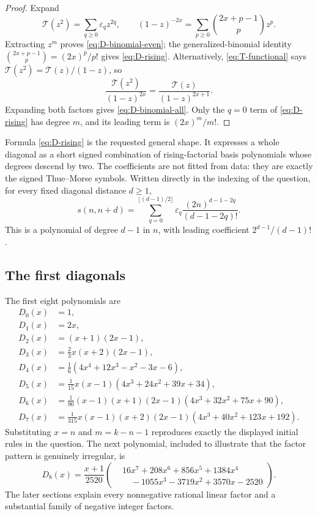 \documentclass[11pt,oneside]{article}
\theoremstyle{definition}
\theoremstyle{remark}
\newcommand{\eps}{\varepsilon}
\newcommand{\Diag}{D}
\newcommand{\TM}{\mathcal T}
\newcommand{\rising}[2]{#1^{\overline{#2}}}
\begin{document}
\begin{proof}
Expand
\[
 \TM(z^2)=\sum_{q\ge0}\eps_qz^{2q},
 \qquad
 (1-z)^{-2x}
   =\sum_{p\ge0}\binom{2x+p-1}{p}z^p.
\]
Extracting $z^m$ proves \eqref{eq:D-binomial-even}; the generalized-binomial
identity
$\binom{2x+p-1}{p}=\rising{(2x)}p/p!$ gives
\eqref{eq:D-rising}.  Alternatively,
\eqref{eq:T-functional} says
$\TM(z^2)=\TM(z)/(1-z)$, so
\[
 \frac{\TM(z^2)}{(1-z)^{2x}}
 =\frac{\TM(z)}{(1-z)^{2x+1}}.
\]
Expanding both factors gives \eqref{eq:D-binomial-all}.  Only the $q=0$
term of \eqref{eq:D-rising} has degree $m$, and its leading term is
$(2x)^m/m!$.
\end{proof}

Formula \eqref{eq:D-rising} is the requested general shape.  It expresses a
whole diagonal as a short signed combination of rising-factorial basis
polynomials whose degrees descend by two.  The coefficients are not fitted
from data: they are exactly the signed Thue--Morse symbols.  Written directly
in the indexing of the question, for every fixed diagonal distance $d\ge1$,
\begin{equation}
 \boxed{\quad
 s(n,n+d)=
 \sum_{q=0}^{\lfloor(d-1)/2\rfloor}
  \eps_q\frac{\rising{(2n)}{d-1-2q}}{(d-1-2q)!}.
 \quad}
 \label{eq:direct-diagonal-distance}
\end{equation}
This is a polynomial of degree $d-1$ in $n$, with leading coefficient
$2^{d-1}/(d-1)!$.

\subsection{The first diagonals}

The first eight polynomials are
\begin{align*}
 \Diag_0(x)&=1,\\
 \Diag_1(x)&=2x,\\
 \Diag_2(x)&=(x+1)(2x-1),\\
 \Diag_3(x)&=\frac{2}{3}x(x+2)(2x-1),\\
 \Diag_4(x)&=\frac{1}{6}
  \left(4x^4+12x^3-x^2-3x-6\right),\\
 \Diag_5(x)&=\frac{1}{15}x(x-1)
  \left(4x^3+24x^2+39x+34\right),\\
 \Diag_6(x)&=\frac{1}{90}(x-1)(x+1)(2x-1)
  \left(4x^3+32x^2+75x+90\right),\\
 \Diag_7(x)&=\frac{1}{315}x(x-1)(x+2)(2x-1)
  \left(4x^3+40x^2+123x+192\right).
\end{align*}
Substituting $x=n$ and $m=k-n-1$ reproduces exactly the displayed initial
rules in the question.  The next polynomial, included to illustrate that the
factor pattern is genuinely irregular, is
\begin{equation}
 \Diag_8(x)=\frac{x+1}{2520}
 \left(
 \begin{aligned}
  &16x^7+208x^6+856x^5+1384x^4\\[-0.2em]
  &\quad{}-1055x^3-3719x^2+3570x-2520
 \end{aligned}
 \right).
 \label{eq:D8}
\end{equation}
The later sections explain every nonnegative rational linear factor and a
substantial family of negative integer factors.
\end{document}
